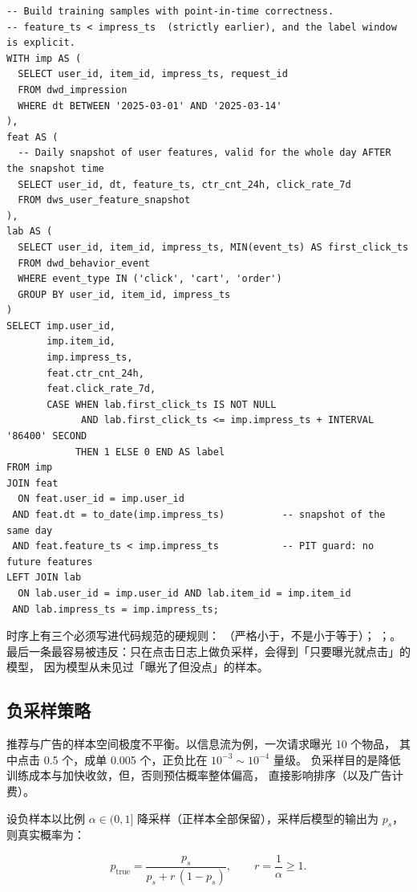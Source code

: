 \begin{lstlisting}[style=growth, language=SQLx, caption={point-in-time 样本拼接：特征侧必须严格早于曝光时刻}]
-- Build training samples with point-in-time correctness.
-- feature_ts < impress_ts  (strictly earlier), and the label window is explicit.
WITH imp AS (
  SELECT user_id, item_id, impress_ts, request_id
  FROM dwd_impression
  WHERE dt BETWEEN '2025-03-01' AND '2025-03-14'
),
feat AS (
  -- Daily snapshot of user features, valid for the whole day AFTER the snapshot time
  SELECT user_id, dt, feature_ts, ctr_cnt_24h, click_rate_7d
  FROM dws_user_feature_snapshot
),
lab AS (
  SELECT user_id, item_id, impress_ts, MIN(event_ts) AS first_click_ts
  FROM dwd_behavior_event
  WHERE event_type IN ('click', 'cart', 'order')
  GROUP BY user_id, item_id, impress_ts
)
SELECT imp.user_id,
       imp.item_id,
       imp.impress_ts,
       feat.ctr_cnt_24h,
       feat.click_rate_7d,
       CASE WHEN lab.first_click_ts IS NOT NULL
             AND lab.first_click_ts <= imp.impress_ts + INTERVAL '86400' SECOND
            THEN 1 ELSE 0 END AS label
FROM imp
JOIN feat
  ON feat.user_id = imp.user_id
 AND feat.dt = to_date(imp.impress_ts)          -- snapshot of the same day
 AND feat.feature_ts < imp.impress_ts           -- PIT guard: no future features
LEFT JOIN lab
  ON lab.user_id = imp.user_id AND lab.item_id = imp.item_id
 AND lab.impress_ts = imp.impress_ts;
\end{lstlisting}

时序上有三个必须写进代码规范的硬规则：
（严格小于，不是小于等于）；
；。
最后一条最容易被违反：只在点击日志上做负采样，会得到「只要曝光就点击」的模型，
因为模型从未见过「曝光了但没点」的样本。

\subsection{负采样策略}

推荐与广告的样本空间极度不平衡。以信息流为例，一次请求曝光 10 个物品，
其中点击 0.5 个，成单 0.005 个，正负比在 $10^{-3} \sim 10^{-4}$ 量级。
负采样目的是降低训练成本与加快收敛，但，否则预估概率整体偏高，
直接影响排序（以及广告计费）。

设负样本以比例 $\alpha \in (0,1]$ 降采样（正样本全部保留），采样后模型的输出为 $p_s$，
则真实概率为：

\begin{equation}
p_{\text{true}} = \frac{p_{s}}{p_{s} + r\,(1 - p_{s})},
\qquad r = \frac{1}{\alpha} \ge 1 .
\label{eq:neg-correct}
\end{equation}

